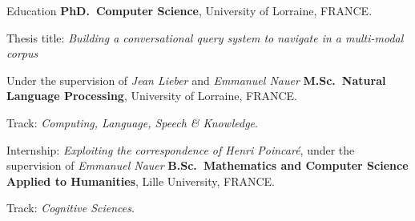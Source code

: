 \begin{rubric}{Education}
\entry*[2024 -- 2027]%
	\textbf{PhD.~Computer Science}, University of Lorraine, FRANCE.
	\par Thesis title: \emph{Building a conversational query system to navigate in a multi-modal corpus}
	\par Under the supervision of \emph{Jean Lieber} and \emph{Emmanuel Nauer}
%
\entry*[2022 -- 2024]%
	\textbf{M.Sc.~Natural Language Processing}, University of Lorraine, FRANCE. \par
	Track: \emph{Computing, Language, Speech \& Knowledge}. \par
	Internship: \emph{Exploiting the correspondence of Henri Poincaré}, under the supervision of \emph{Emmanuel Nauer}
% 
\entry*[2019 -- 2022]%
	\textbf{B.Sc.~Mathematics and Computer Science Applied to Humanities}, Lille University, FRANCE.\par
	Track: \emph{Cognitive Sciences}. \par
\end{rubric}
